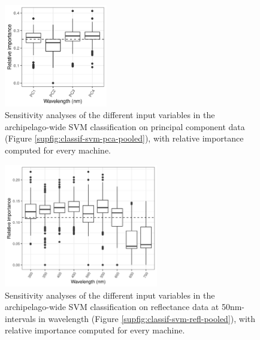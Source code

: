 \begin{figure}[H]
	\centering
	\includegraphics[width=0.4\textwidth]{"../analyses/04-machine learning/plots/importance_svm_pca_pooled"}
	\caption{Sensitivity analyses of the different input variables in the archipelago-wide SVM classification on principal component data (Figure \ref{supfig:classif-svm-pca-pooled}), with relative importance computed for every machine.}
	\label{supfig:importance-svm-pca-pooled}
\end{figure}

\begin{figure}[H]
	\centering
	\includegraphics[width=0.6\textwidth]{"../analyses/04-machine learning/plots/importance_svm_refl_pooled"}
	\caption{Sensitivity analyses of the different input variables in the archipelago-wide SVM classification on reflectance data at 50nm-intervals in wavelength (Figure \ref{supfig:classif-svm-refl-pooled}), with relative importance computed for every machine.}
	\label{supfig:importance-svm-refl-pooled}
\end{figure}

